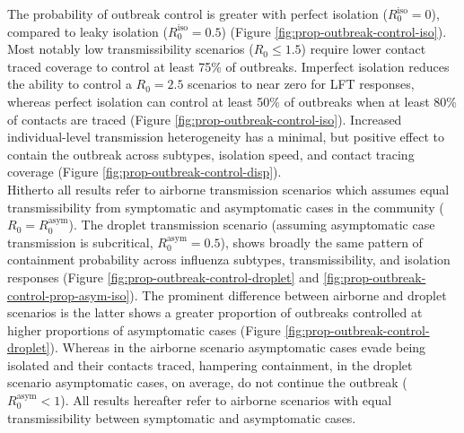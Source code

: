 \documentclass{article}
\begin{document}
The probability of outbreak control is greater with perfect isolation ($R_0^\mathrm{iso} = 0$), compared to leaky isolation ($R_0^\mathrm{iso} = 0.5$) (Figure \ref{fig:prop-outbreak-control-iso}). Most notably low transmissibility scenarios ($R_0 \leq 1.5$) require lower contact traced coverage to control at least 75\% of outbreaks. Imperfect isolation reduces the ability to control a $R_0 = 2.5$ scenarios to near zero for LFT responses, whereas perfect isolation can control at least 50\% of outbreaks when at least 80\% of contacts are traced (Figure \ref{fig:prop-outbreak-control-iso}). Increased individual-level transmission heterogeneity has a minimal, but positive effect to contain the outbreak across subtypes, isolation speed, and contact tracing coverage (Figure \ref{fig:prop-outbreak-control-disp}). \\

Hitherto all results refer to airborne transmission scenarios which assumes equal transmissibility from symptomatic and asymptomatic cases in the community ($R_0 = R_0^\mathrm{asym}$). The droplet transmission scenario (assuming asymptomatic case transmission is subcritical, $R_0^\mathrm{asym} = 0.5$), shows broadly the same pattern of containment probability across influenza subtypes, transmissibility, and isolation responses (Figure \ref{fig:prop-outbreak-control-droplet} and \ref{fig:prop-outbreak-control-prop-asym-iso}). The prominent difference between airborne and droplet scenarios is the latter shows a greater proportion of outbreaks controlled at higher proportions of asymptomatic cases (Figure \ref{fig:prop-outbreak-control-droplet}). Whereas in the airborne scenario asymptomatic cases evade being isolated and their contacts traced, hampering containment, in the droplet scenario asymptomatic cases, on average, do not continue the outbreak ($R_0^\mathrm{asym} < 1$). All results hereafter refer to airborne scenarios with equal transmissibility between symptomatic and asymptomatic cases. \\
\end{document}
